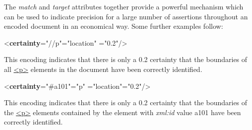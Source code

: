 The {\itshape match} and {\itshape target} attributes together provide a powerful mechanism which can be used to indicate precision for a large number of assertions throughout an encoded document in an economical way. Some further examples follow: \par\bgroup{}\exampleFont \begin{shaded}\noindent\mbox{}{<\textbf{certainty}\hspace*{1em}{match}="{//p}"\hspace*{1em}{locus}="{location}"\mbox{}\newline 
\hspace*{1em}{degree}="{0.2}"/>}\end{shaded}\egroup\par \noindent  This encoding indicates that there is only a 0.2 certainty that the boundaries of all \hyperref[TEI.p]{<p>} elements in the document have been correctly identified.\par
\par\bgroup{}\exampleFont \begin{shaded}\noindent\mbox{}{<\textbf{certainty}\hspace*{1em}{target}="{\#a101}"\hspace*{1em}{match}="{p}"\mbox{}\newline 
\hspace*{1em}{locus}="{location}"\hspace*{1em}{degree}="{0.2}"/>}\end{shaded}\egroup\par \noindent  This encoding indicates that there is only a 0.2 certainty that the boundaries of the \hyperref[TEI.p]{<p>} elements contained by the element with {\itshape xml:id} value a101 have been correctly identified.\par

